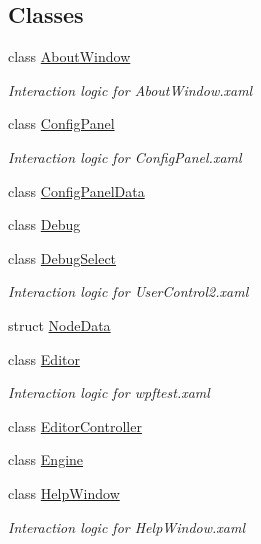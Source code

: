 \subsection*{Classes}
\begin{DoxyCompactItemize}
\item 
class \hyperlink{class_interface_graphique_1_1_about_window}{About\-Window}
\begin{DoxyCompactList}\small\item\em Interaction logic for About\-Window.\-xaml \end{DoxyCompactList}\item 
class \hyperlink{class_interface_graphique_1_1_config_panel}{Config\-Panel}
\begin{DoxyCompactList}\small\item\em Interaction logic for Config\-Panel.\-xaml \end{DoxyCompactList}\item 
class \hyperlink{class_interface_graphique_1_1_config_panel_data}{Config\-Panel\-Data}
\item 
class \hyperlink{class_interface_graphique_1_1_debug}{Debug}
\item 
class \hyperlink{class_interface_graphique_1_1_debug_select}{Debug\-Select}
\begin{DoxyCompactList}\small\item\em Interaction logic for User\-Control2.\-xaml \end{DoxyCompactList}\item 
struct \hyperlink{struct_interface_graphique_1_1_node_data}{Node\-Data}
\item 
class \hyperlink{class_interface_graphique_1_1_editor}{Editor}
\begin{DoxyCompactList}\small\item\em Interaction logic for wpftest.\-xaml \end{DoxyCompactList}\item 
class \hyperlink{class_interface_graphique_1_1_editor_controller}{Editor\-Controller}
\item 
class \hyperlink{class_interface_graphique_1_1_engine}{Engine}
\item 
class \hyperlink{class_interface_graphique_1_1_help_window}{Help\-Window}
\begin{DoxyCompactList}\small\item\em Interaction logic for Help\-Window.\-xaml \end{DoxyCompactList}\item 

\end{DoxyCompactItemize}
